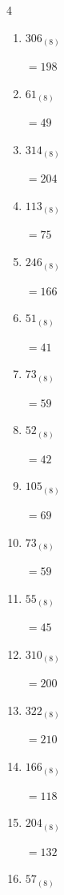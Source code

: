 \begin{multicols}{4}
\begin{enumerate}
        $=78$

  \item $306_{(8)}$

        $=198$

  \item $61_{(8)}$

        $=49$

  \item $314_{(8)}$

        $=204$

  \item $113_{(8)}$

        $=75$

  \item $246_{(8)}$

        $=166$

  \item $51_{(8)}$

        $=41$

  \item $73_{(8)}$

        $=59$

  \item $52_{(8)}$

        $=42$

  \item $105_{(8)}$

        $=69$

  \item $73_{(8)}$

        $=59$

  \item $55_{(8)}$

        $=45$

  \item $310_{(8)}$

        $=200$

  \item $322_{(8)}$

        $=210$

  \item $166_{(8)}$

        $=118$

\columnbreak %

\resetques

  \item $204_{(8)}$

        $=132$

  \item $57_{(8)}$


\end{enumerate}
\end{multicols}

